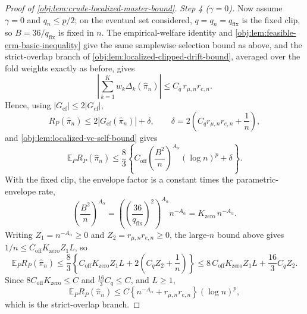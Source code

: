 \begin{proof}[Proof of \cref{obj:lem:crude-localized-master-bound}]
\emph{Step 4 (\(\gamma=0\)).}  Now assume \(\gamma=0\) and \(q_n\le\underline p/2\); on the eventual set considered, \(q=q_n=q_{\mathrm{fix}}\) is the fixed clip, so \(B=36/q_{\mathrm{fix}}\) is fixed in \(n\).  The empirical-welfare identity and \cref{obj:lem:feasible-erm-basic-inequality} give the same samplewise selection bound as above, and the strict-overlap branch of \cref{obj:lem:localized-clipped-drift-bound}, averaged over the fold weights exactly as before, gives
\[
\left|\sum_{k=1}^Kw_k\Delta_k(\widehat\pi_n)\right|
\le C_q\,r_{\mu,n}r_{e,n}.
\]
Hence, using \(|G_{\mathrm{cf}}|\le2|G_{\mathrm{cf}}|\),
\[
R_P(\widehat\pi_n)\le 2\left|G_{\mathrm{cf}}(\widehat\pi_n)\right|+\delta,
\qquad
\delta=2\left(C_q r_{\mu,n}r_{e,n}+\frac1n\right),
\]
and \cref{obj:lem:localized-vc-self-bound} gives
\[
\mathbb E_PR_P(\widehat\pi_n)
\le
\frac83\left\{C_{\mathrm{off}}\left(\frac{B^2}{n}\right)^{A_\alpha}(\log n)^p+\delta\right\}.
\]
With the fixed clip, the envelope factor is a constant times the parametric-envelope rate,
\[
\left(\frac{B^2}{n}\right)^{A_\alpha}
=
\left(\left(\frac{36}{q_{\mathrm{fix}}}\right)^2\right)^{A_\alpha}n^{-A_\alpha}
=
K_{\mathrm{zero}}\,n^{-A_\alpha}.
\]
Writing \(Z_1=n^{-A_\alpha}\ge0\) and \(Z_2=r_{\mu,n}r_{e,n}\ge0\), the large-\(n\) bound above gives \(1/n\le C_{\mathrm{off}}K_{\mathrm{zero}}Z_1L\), so
\[
\mathbb E_PR_P(\widehat\pi_n)
\le
\frac83\left\{C_{\mathrm{off}}K_{\mathrm{zero}}Z_1L+2\left(C_qZ_2+\frac1n\right)\right\}
\le
8\,C_{\mathrm{off}}K_{\mathrm{zero}}Z_1L+\frac{16}3C_qZ_2 .
\]
Since \(8C_{\mathrm{off}}K_{\mathrm{zero}}\le C\) and \(\tfrac{16}3C_q\le C\), and \(L\ge1\),
\[
\mathbb E_P R_P(\widehat\pi_n)
\le
C\left\{
n^{-A_\alpha}+r_{\mu,n}r_{e,n}
\right\}(\log n)^p,
\]
which is the strict-overlap branch. %
\end{proof}
